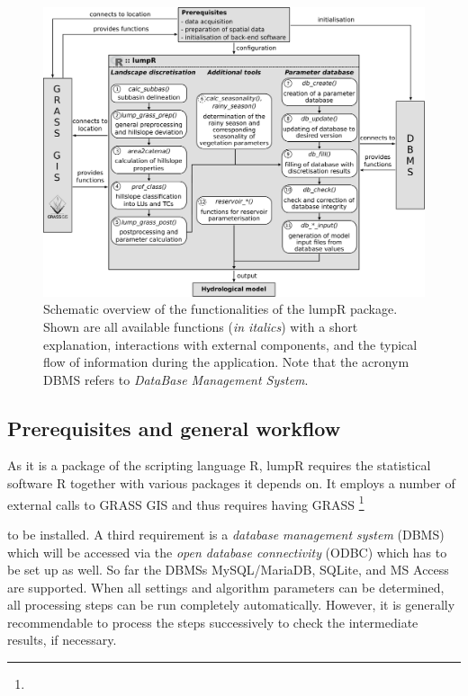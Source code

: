 \begin{figure}[t]
\DIFdelbeginFL %
\DIFdelendFL \DIFaddbeginFL \includegraphics[width=\linewidth]{../Script/lumpr_scheme_numbers_rlogo.pdf}
\DIFaddendFL \caption{Schematic overview of the functionalities of the lumpR package. Shown are all available functions (\textit{in italics}) with a short explanation, interactions with external components, and the typical flow of information during the application. \DIFaddbeginFL {}\DIFaddendFL Note that the acronym DBMS refers to \emph{DataBase Management System}.}
\label{fig:lumpr_scheme}
\end{figure}

\subsection{Prerequisites and general workflow}
\label{sec:Prerequisites}
As it is a package of the scripting language R, lumpR requires the statistical software R together with various packages it depends on.
It employs a number of external calls to GRASS GIS and thus requires having GRASS \DIFdelbegin {}\footnote{} %
\addtocounter{footnote}{-1}%
\DIFdelend to be installed. 
A third requirement is a \emph{database management system} (DBMS) which will be accessed via the \emph{open database connectivity} (ODBC) which has to be set up as well.
So far the DBMSs MySQL/MariaDB, SQLite, and MS Access are supported.
When all settings and algorithm parameters can be determined, all processing steps can be run completely automatically.
However, it is generally recommendable to process the steps successively to check the intermediate results, if necessary.

